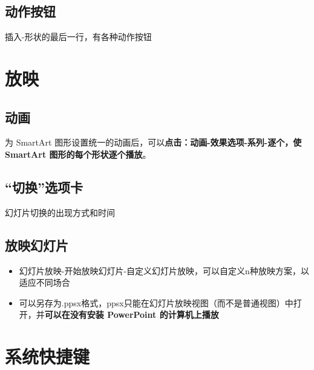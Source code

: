 \documentclass[]{ctexbook}
\providecommand{\tightlist}{%
  \setlength{\itemsep}{0pt}\setlength{\parskip}{0pt}}
\begin{document}
\hypertarget{ux52a8ux4f5cux6309ux94ae}{%
\section{动作按钮}\label{ux52a8ux4f5cux6309ux94ae}}

插入-形状的最后一行，有各种动作按钮

\hypertarget{ux653eux6620}{%
\chapter{放映}\label{ux653eux6620}}

\hypertarget{ux52a8ux753b}{%
\section{动画}\label{ux52a8ux753b}}

为 SmartArt 图形设置统一的动画后，可以\textbf{点击：动画-效果选项-系列-逐个，使 SmartArt 图形的每个形状逐个播放}。

\hypertarget{ux5207ux6362ux9009ux9879ux5361}{%
\section{``切换''选项卡}\label{ux5207ux6362ux9009ux9879ux5361}}

幻灯片切换的出现方式和时间

\hypertarget{ux653eux6620ux5e7bux706fux7247}{%
\section{放映幻灯片}\label{ux653eux6620ux5e7bux706fux7247}}

\begin{itemize}
\tightlist
\item
  幻灯片放映-开始放映幻灯片-自定义幻灯片放映，可以自定义n种放映方案，以适应不同场合
\item
  可以另存为.ppsx格式，ppsx只能在幻灯片放映视图（而不是普通视图）中打开，并\textbf{可以在没有安装 PowerPoint 的计算机上播放}
\end{itemize}

\cleardoublepage

\hypertarget{appendix-ux9644ux5f55}{%
\appendix {}}


\hypertarget{chapter-shortcut}{%
\chapter{系统快捷键}\label{chapter-shortcut}}
\end{document}
